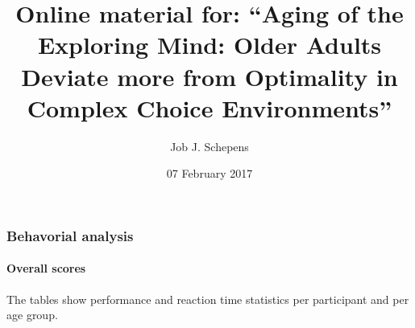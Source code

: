 \documentclass[,]{article}
\title{Online material for: ``Aging of the Exploring Mind: Older Adults Deviate
more from Optimality in Complex Choice Environments''}
\author{Job J. Schepens}
\date{07 February 2017}
\let\oldparagraph\paragraph
\renewcommand{\paragraph}[1]{\oldparagraph{#1}\mbox{}}
\begin{document}
\maketitle

{
\setcounter{tocdepth}{6}
\tableofcontents
}
\newpage

\subsubsection{Behavorial analysis}\label{behavorial-analysis}

\paragraph{Overall scores}\label{overall-scores}

The tables show performance and reaction time statistics per participant
and per age group.

\newpage 
\end{document}
